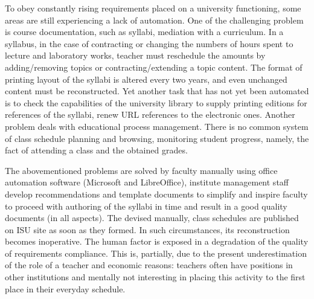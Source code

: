 \documentclass[
]{aiitart}
\begin{document}
To obey constantly rising requirements placed on a university functioning, some areas are still experiencing a lack of automation. One of the challenging problem is course documentation, such as syllabi, mediation with a curriculum. In a syllabus, in the case of contracting or changing the numbers of hours spent to lecture and laboratory works, teacher must reschedule the amounts by adding/removing topics or contracting/extending a topic content.  The format of printing layout of the syllabi is altered every two years, and even unchanged content must be reconstructed.  Yet another task that has not yet been automated is to check the capabilities of the university library to supply printing editions for references of the syllabi, renew URL references to the electronic ones.  Another problem deals with educational process management.  There is no common system of class schedule planning and browsing, monitoring student progress, namely, the fact of attending a class and the obtained grades.  %

The abovementioned problems are solved by faculty manually using office automation software (Microsoft and LibreOffice), institute management staff develop recommendations and template documents to simplify and inspire faculty to proceed with authoring of the syllabi in time and result in a good quality documents (in all aspects).  The devised manually, class schedules are published on ISU site as soon as they formed.  In such circumstances, its reconstruction becomes inoperative.   %
The human factor is exposed in a degradation of the quality of requirements compliance.  This is, partially, due to the present underestimation of the role of a teacher and economic reasons: teachers often have positions in other institutions and mentally not interesting in placing this activity to the first place in their everyday schedule.
\end{document}
